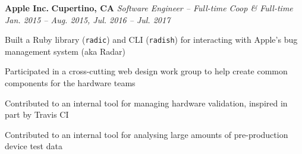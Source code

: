 \item
\headerrow
{\textbf{Apple Inc.}}
{\textbf{Cupertino, CA}}
\headerrow
{\emph{Software Engineer -- Full-time Coop \& Full-time}}
{\emph{Jan. 2015 -- Aug. 2015, Jul. 2016 -- Jul. 2017}}
\begin{itemize*}
    \item Built a Ruby library (\texttt{radic}) and CLI (\texttt{radish}) for
    interacting with Apple's bug management system (aka Radar)
    \item Participated in a cross-cutting web design work group to help create
    common components for the hardware teams
    \item Contributed to an internal tool for managing hardware validation,
    inspired in part by Travis CI
    \item Contributed to an internal tool for analysing large amounts of
    pre-production device test data
\end{itemize*}
